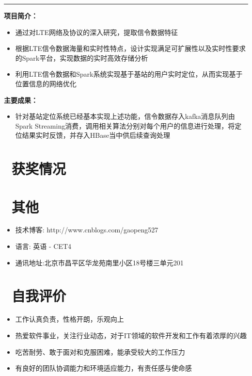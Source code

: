 \documentclass{resume}
\begin{document}
\rule{\textwidth}{0.1mm}
\begin{onehalfspacing}
\textbf{项目简介：}
\begin{itemize}
  \item 通过对LTE网络及协议的深入研究，提取信令数据特征
  \item 根据LTE信令数据海量和实时性特点，设计实现满足可扩展性以及实时性要求的Spark平台，实现数据的实时高效存储分析
  \item 利用LTE信令数据和Spark系统实现基于基站的用户实时定位，从而实现基于位置信息的网络优化
\end{itemize}
\textbf{主要成果：}
\begin{itemize}
  \item 针对基站定位系统已经基本实现上述功能，信令数据存入kafka消息队列由Spark Streaming消费，调用相关算法分别对每个用户的信息进行处理，将定位结果实时反馈，并存入HBase当中供后续查询处理
\end{itemize}
\end{onehalfspacing}

\section{\faHeartO\ 获奖情况}

\section{\faInfo\ 其他}
\begin{itemize}[parsep=0.5ex]
  \item 技术博客: http://www.cnblogs.com/gaopeng527
  \item 语\hspace{2em}言: 英语 - CET4
  \item 通讯地址:北京市昌平区华龙苑南里小区18号楼三单元201
\end{itemize}

\section{\faTags\ 自我评价}
\begin{itemize}[parsep=0.5ex]
  \item 工作认真负责，性格开朗，乐观向上
  \item 热爱软件事业，关注行业动态，对于IT领域的软件开发和工作有着浓厚的兴趣
  \item 吃苦耐劳、敢于面对和克服困难，能承受较大的工作压力
  \item 有良好的团队协调能力和环境适应能力，有责任感与使命感
\end{itemize}

%
%
\end{document}
